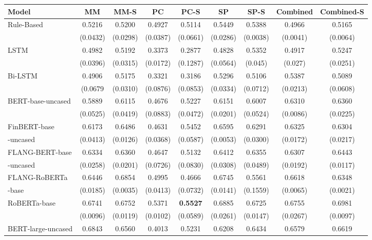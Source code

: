 \documentclass[11pt]{article}
\begin{document}
\begin{table*}[ht]
\centering
\footnotesize
\begin{tabular}{lcccccccc}
  \hline
  \textbf{Model} & \textbf{MM} & \textbf{MM-S} & \textbf{PC} & \textbf{PC-S} & \textbf{SP} & \textbf{SP-S} & \textbf{Combined} & \textbf{Combined-S} \\ 
  \hline
  Rule-Based & 0.5216 & 0.5200 & 0.4927 &  0.5114 & 0.5449 & 0.5388 & 0.4966 & 0.5165 \\ 
 & (0.0432) & (0.0298) & (0.0387) & (0.0661) & (0.0286)
 & (0.0038) & (0.0041) & (0.0064)\\
  \hline
  LSTM & 0.4982 & 0.5192 & 0.3373 & 0.2877 & 0.4828 & 0.5352 & 0.4917 & 0.5247\\ 
  & (0.0396) & (0.0315) & (0.0172) & (0.1287) & (0.0564) & (0.045) & (0.027) & (0.0251)\\
  Bi-LSTM & 0.4906 & 0.5175 & 0.3321 & 0.3186 & 0.5296 & 0.5106 & 0.5387 & 0.5089\\ 
  & (0.0679 & (0.0310) & (0.0876) & (0.0853) & (0.0334) & (0.0712) & (0.0213) & (0.0608)\\
  \hline
  BERT-base-uncased & 0.5889 & 0.6115 & 0.4676 &  0.5227 & 0.6151 & 0.6007 & 0.6310 & 0.6360 \\ 
       & (0.0525) & (0.0419) & (0.0883) &  (0.0472) & (0.0201) & (0.0524) & (0.0086) & (0.0225) \\ 
  FinBERT-base & 0.6173 & 0.6486 & 0.4631 & 0.5452 & 0.6595 & 0.6291 & 0.6325 & 0.6304 \\ 
  -uncased     & (0.0413) & (0.0126) & (0.0368) & (0.0587) & (0.0053) & (0.0300) & (0.0172) & (0.0217) \\ 
  FLANG-BERT-base & 0.6334 & 0.6360 & 0.4647 & 0.5132 & 0.6412 & 0.6355 & 0.6307 & 0.6443 \\ 
  -uncased        & (0.0258) & (0.0201) & (0.0726) & (0.0830) & (0.0308) & (0.0489) & (0.0192) & (0.0117) \\
  FLANG-RoBERTa & 0.6446 & 0.6854 & 0.4995 &  0.4666 & 0.6745 & 0.5561 & 0.6618 & 0.6348 \\ 
  -base      & (0.0185) & (0.0035) & (0.0413) &  (0.0732) & (0.0141) & (0.1559) & (0.0065) & (0.0021) \\ 
  RoBERTa-base & 0.6741 & 0.6752 & 0.5371 & \textbf{0.5527} & 0.6885 & 0.6725 & 0.6755 & 0.6981 \\ 
          & (0.0096) & (0.0119) & (0.0102) & (0.0589) & (0.0261) & (0.0147) & (0.0267) & (0.0097) \\ 
  \hline
  BERT-large-uncased & 0.6843 & 0.6560 & 0.4013 &  0.5231 & 0.6208 & 0.6434 & 0.6579 & 0.6619 \\ 

\end{tabular}
\end{table*}
\end{document}
